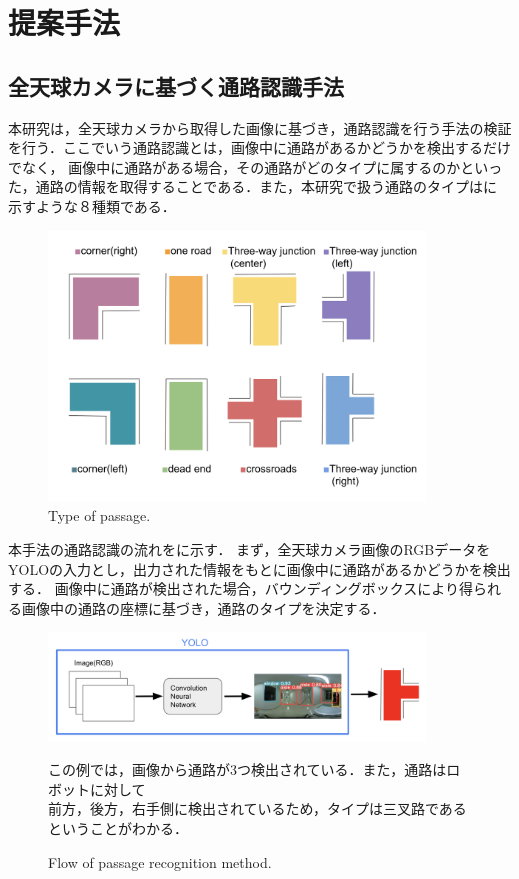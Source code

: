 \documentclass[../main]{subfiles}
\begin{document}
    \setcounter{secnumdepth}{2}
    \chapter{提案手法}
        \section{全天球カメラに基づく通路認識手法}
        本研究は，全天球カメラから取得した画像に基づき，通路認識を行う手法の検証を行う．ここでいう通路認識とは，画像中に通路があるかどうかを検出するだけでなく，
        画像中に通路がある場合，その通路がどのタイプに属するのかといった，通路の情報を取得することである．また，本研究で扱う通路のタイプはに
        示すような８種類である．

        \begin{figure}[H]
            \centering
            \includegraphics[width=10cm]{../images/new_aisle_type.png}
            \caption{Type of passage.}
            \label{figure::new_aisle_type}
        \end{figure}
        
        \newpage

        本手法の通路認識の流れをに示す．
        まず，全天球カメラ画像のRGBデータをYOLOの入力とし，出力された情報をもとに画像中に通路があるかどうかを検出する．
        画像中に通路が検出された場合，バウンディングボックスにより得られる画像中の通路の座標に基づき，通路のタイプを決定する．

        \begin{figure}[H]
            \centering
            \includegraphics[width=10cm]{../images/proposed_method2.png}
            \caption{Flow of passage recognition method.}
            \label{figure::proposed_method_fig}
            この例では，画像から通路が3つ検出されている．また，通路はロボットに対して\\
            前方，後方，右手側に検出されているため，タイプは三叉路であるということがわかる．
        \end{figure}
\end{document}
